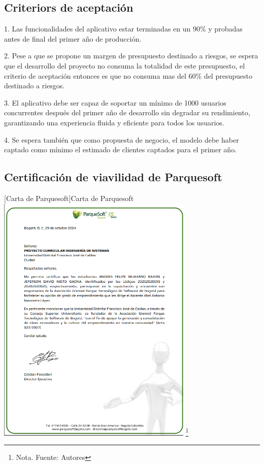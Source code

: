     \subsection{Criteriors de aceptación}
    
    1. Las funcionalidades del aplicativo  estar terminadas en un 90\% y probadas antes de final del primer año de producción.
    
    2. Pese a que se propone un margen de presupuesto destinado a riesgos, se espera que el desarrollo del proyecto no consuma la totalidad de este presupuesto, el criterio de aceptación entonces es que no consuma mas del 60\% del presupuesto destinado a riesgos.

    3. El aplicativo debe ser capaz de soportar un mínimo de 1000 usuarios concurrentes después del primer año de desarrollo sin degradar su rendimiento, garantizando una experiencia fluida y eficiente para todos los usuarios.

    4. Se espera también que como propuesta de negocio, el modelo debe haber captado como mínimo el estimado de clientes captados para el primer año.

    \subsection{Certificación de viavilidad de Parquesoft} 
        \centering
        [{Carta de Parquesoft}]{Carta de Parquesoft}
         \includegraphics[width=0.7\textwidth]{Content/Images/CartaParquesoft.png}
        \footnote{Nota. \textup{Fuente: Autores }}
